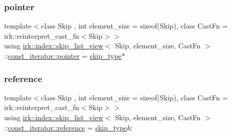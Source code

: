 \subsubsection{\texorpdfstring{pointer}{pointer}}
{\footnotesize\ttfamily template$<$class Skip , int element\+\_\+size = sizeof(\+Skip), class Cast\+Fn  = irk\+::reinterpret\+\_\+cast\+\_\+fn$<$\+Skip$>$$>$ \\
using \mbox{\hyperlink{classirk_1_1index_1_1skip__list__view}{irk\+::index\+::skip\+\_\+list\+\_\+view}}$<$ Skip, element\+\_\+size, Cast\+Fn $>$\+::\mbox{\hyperlink{structirk_1_1index_1_1skip__list__view_1_1const__iterator_a1bce3758616ad33105fa64b68a03bd8b}{const\+\_\+iterator\+::pointer}} =  \mbox{\hyperlink{classirk_1_1index_1_1skip__list__view_a7fa2224428803eee24062bb123978755}{skip\+\_\+type}}$\ast$}

\mbox{\label{structirk_1_1index_1_1skip__list__view_1_1const__iterator_ad31e12de91ba22af75cfc00068f80e97}} 
\subsubsection{\texorpdfstring{reference}{reference}}
{\footnotesize\ttfamily template$<$class Skip , int element\+\_\+size = sizeof(\+Skip), class Cast\+Fn  = irk\+::reinterpret\+\_\+cast\+\_\+fn$<$\+Skip$>$$>$ \\
using \mbox{\hyperlink{classirk_1_1index_1_1skip__list__view}{irk\+::index\+::skip\+\_\+list\+\_\+view}}$<$ Skip, element\+\_\+size, Cast\+Fn $>$\+::\mbox{\hyperlink{structirk_1_1index_1_1skip__list__view_1_1const__iterator_ad31e12de91ba22af75cfc00068f80e97}{const\+\_\+iterator\+::reference}} =  \mbox{\hyperlink{classirk_1_1index_1_1skip__list__view_a7fa2224428803eee24062bb123978755}{skip\+\_\+type}}\&}

\mbox{\label{structirk_1_1index_1_1skip__list__view_1_1const__iterator_a1b3eae3418d5b4d4f055a6841bd46ffa}} 
